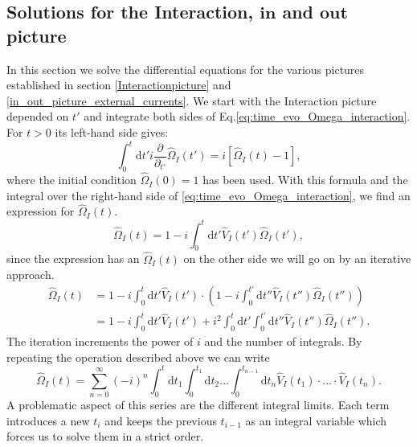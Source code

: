 \documentclass[12pt, titlepage]{article}
\begin{document}
\subsection{Solutions for the Interaction, $ \pmb{in} $  and $ \pmb{out} $ picture}\label{solutions_interaction_in_out}
In this section we solve the differential equations for the various pictures established in section \ref{Interactionpicture} and \ref{in_out_picture_external_currents}.
We start with the Interaction picture depended on $ t' $  and integrate both sides of Eq.\enskip\eqref{eq:time_evo_Omega_interaction}. For $ t>0 $ its left-hand side gives:
\begin{equation}\label{first_term_left_Omega_time_order}
\int_{0}^{t}\mathrm{d}t'
 i 
 \frac{\partial}{\partial_{t'}} 
 \hat{\Omega}_{I} (t')
 =
 i
 \left[ 
\hat{\Omega}_{I}(t) -1
 \right] 
 ,
\end{equation}
where the initial condition $ \hat{\Omega}_{I}(0)=1 $ has been used.
With this formula and the integral over the right-hand side of \eqref{eq:time_evo_Omega_interaction}, we find an expression for $ \hat{\Omega}_{I}(t) $.
\begin{equation}
\hat{\Omega}_{I}(t)=
1
-
i
\int_{0}^{t}\mathrm{d}t'\hat{V}_{I}(t')\hat{\Omega}_{I}(t')	,
\end{equation}
since the expression has an $ \hat{\Omega}_{I}(t) $ on the other side we will go on by an iterative approach.
\begin{equation}\label{Omega_first_terms}
\begin{split}
\hat{\Omega}_{I}(t)
&=
1
-
i 
\int_{0}^{t}\mathrm{d}t'\hat{V}_{I}(t')
\cdot
\left( 
1
-
i
\int_{0}^{t'}\mathrm{d}t''\hat{V}_{I}(t'')\hat{\Omega}_{I}(t'')
\right) 
\\
&=
1
-
i
\int_{0}^{t}\mathrm{d}t'\hat{V}_{I}(t')
+i^{2} 
\int_{0}^{t}\mathrm{d}t'
\int_{0}^{t'}\mathrm{d}t''
\hat{V}_{I}(t'')\hat{\Omega}_{I}(t'')
.
\end{split}
\end{equation}
The iteration increments the power of $ i $ and the number of integrals. By repeating the operation described above we can write
\begin{equation}\label{Omega_different_t}
\hat{\Omega}_{I}(t) =
\sum\limits_{n=0}^{\infty} 
(-i)^{n}
\int_{0}^{t}\mathrm{d}t_1\int_{0}^{t_{1}}\! \! \mathrm{d}t_2
 \ldots
 \int_{0}^{t_{n-1}}\! \! \mathrm{d}t_n
  \hat{V}_{I}(t_1)\cdot \ldots \cdot \hat{V}_{I}(t_n)
  .
\end{equation}
A problematic aspect of this series are the different integral limits. Each term introduces a new $ t_{i} $ and keeps the previous $ t_{i-1} $ as an integral variable which forces us to solve them in a strict order. 
\end{document}
